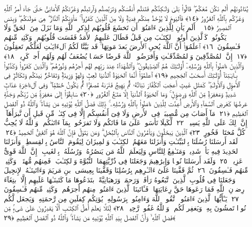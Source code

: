 يُنَادُونَهُم أَلَم نَكُن مَّعَكُم ۖ قَالُوا۟ بَلَىٰ وَلَـٰكِنَّكُم فَتَنتُم أَنفُسَكُم وَتَرَبَّصتُم وَٱرتَبتُم وَغَرَّتكُمُ ٱلأَمَانِىُّ حَتَّىٰ جَآءَ أَمرُ ٱللَّهِ وَغَرَّكُم بِٱللَّهِ ٱلغَرُورُ ﴿١٤﴾
 فَٱليَومَ لَا يُؤخَذُ مِنكُم فِديَةٌۭ وَلَا مِنَ ٱلَّذِينَ كَفَرُوا۟ ۚ مَأوَىٰكُمُ ٱلنَّارُ ۖ هِىَ مَولَىٰكُم ۖ وَبِئسَ ٱلمَصِيرُ ﴿١٥﴾
 ۞ أَلَم يَأنِ لِلَّذِينَ ءَامَنُوٓا۟ أَن تَخشَعَ قُلُوبُهُم لِذِكرِ ٱللَّهِ وَمَا نَزَلَ مِنَ ٱلحَقِّ وَلَا يَكُونُوا۟ كَٱلَّذِينَ أُوتُوا۟ ٱلكِتَـٰبَ مِن قَبلُ فَطَالَ عَلَيهِمُ ٱلأَمَدُ فَقَسَت قُلُوبُهُم ۖ وَكَثِيرٌۭ مِّنهُم فَـٰسِقُونَ ﴿١٦﴾
 ٱعلَمُوٓا۟ أَنَّ ٱللَّهَ يُحىِ ٱلأَرضَ بَعدَ مَوتِهَا ۚ قَد بَيَّنَّا لَكُمُ ٱلءَايَـٰتِ لَعَلَّكُم تَعقِلُونَ ﴿١٧﴾
 إِنَّ ٱلمُصَّدِّقِينَ وَٱلمُصَّدِّقَـٰتِ وَأَقرَضُوا۟ ٱللَّهَ قَرضًا حَسَنًۭا يُضَٰعَفُ لَهُم وَلَهُم أَجرٌۭ كَرِيمٌۭ ﴿١٨﴾
 وَٱلَّذِينَ ءَامَنُوا۟ بِٱللَّهِ وَرُسُلِهِۦٓ أُو۟لَـٰٓئِكَ هُمُ ٱلصِّدِّيقُونَ ۖ وَٱلشُّهَدَآءُ عِندَ رَبِّهِم لَهُم أَجرُهُم وَنُورُهُم ۖ وَٱلَّذِينَ كَفَرُوا۟ وَكَذَّبُوا۟ بِـَٔايَـٰتِنَآ أُو۟لَـٰٓئِكَ أَصحَـٰبُ ٱلجَحِيمِ ﴿١٩﴾
 ٱعلَمُوٓا۟ أَنَّمَا ٱلحَيَوٰةُ ٱلدُّنيَا لَعِبٌۭ وَلَهوٌۭ وَزِينَةٌۭ وَتَفَاخُرٌۢ بَينَكُم وَتَكَاثُرٌۭ فِى ٱلأَموَٟلِ وَٱلأَولَـٰدِ ۖ كَمَثَلِ غَيثٍ أَعجَبَ ٱلكُفَّارَ نَبَاتُهُۥ ثُمَّ يَهِيجُ فَتَرَىٰهُ مُصفَرًّۭا ثُمَّ يَكُونُ حُطَٰمًۭا ۖ وَفِى ٱلءَاخِرَةِ عَذَابٌۭ شَدِيدٌۭ وَمَغفِرَةٌۭ مِّنَ ٱللَّهِ وَرِضوَٟنٌۭ ۚ وَمَا ٱلحَيَوٰةُ ٱلدُّنيَآ إِلَّا مَتَـٰعُ ٱلغُرُورِ ﴿٢٠﴾
 سَابِقُوٓا۟ إِلَىٰ مَغفِرَةٍۢ مِّن رَّبِّكُم وَجَنَّةٍ عَرضُهَا كَعَرضِ ٱلسَّمَآءِ وَٱلأَرضِ أُعِدَّت لِلَّذِينَ ءَامَنُوا۟ بِٱللَّهِ وَرُسُلِهِۦ ۚ ذَٟلِكَ فَضلُ ٱللَّهِ يُؤتِيهِ مَن يَشَآءُ ۚ وَٱللَّهُ ذُو ٱلفَضلِ ٱلعَظِيمِ ﴿٢١﴾
 مَآ أَصَابَ مِن مُّصِيبَةٍۢ فِى ٱلأَرضِ وَلَا فِىٓ أَنفُسِكُم إِلَّا فِى كِتَـٰبٍۢ مِّن قَبلِ أَن نَّبرَأَهَآ ۚ إِنَّ ذَٟلِكَ عَلَى ٱللَّهِ يَسِيرٌۭ ﴿٢٢﴾
 لِّكَيلَا تَأسَوا۟ عَلَىٰ مَا فَاتَكُم وَلَا تَفرَحُوا۟ بِمَآ ءَاتَىٰكُم ۗ وَٱللَّهُ لَا يُحِبُّ كُلَّ مُختَالٍۢ فَخُورٍ ﴿٢٣﴾
 ٱلَّذِينَ يَبخَلُونَ وَيَأمُرُونَ ٱلنَّاسَ بِٱلبُخلِ ۗ وَمَن يَتَوَلَّ فَإِنَّ ٱللَّهَ هُوَ ٱلغَنِىُّ ٱلحَمِيدُ ﴿٢٤﴾
 لَقَد أَرسَلنَا رُسُلَنَا بِٱلبَيِّنَـٰتِ وَأَنزَلنَا مَعَهُمُ ٱلكِتَـٰبَ وَٱلمِيزَانَ لِيَقُومَ ٱلنَّاسُ بِٱلقِسطِ ۖ وَأَنزَلنَا ٱلحَدِيدَ فِيهِ بَأسٌۭ شَدِيدٌۭ وَمَنَـٰفِعُ لِلنَّاسِ وَلِيَعلَمَ ٱللَّهُ مَن يَنصُرُهُۥ وَرُسُلَهُۥ بِٱلغَيبِ ۚ إِنَّ ٱللَّهَ قَوِىٌّ عَزِيزٌۭ ﴿٢٥﴾
 وَلَقَد أَرسَلنَا نُوحًۭا وَإِبرَٰهِيمَ وَجَعَلنَا فِى ذُرِّيَّتِهِمَا ٱلنُّبُوَّةَ وَٱلكِتَـٰبَ ۖ فَمِنهُم مُّهتَدٍۢ ۖ وَكَثِيرٌۭ مِّنهُم فَـٰسِقُونَ ﴿٢٦﴾
 ثُمَّ قَفَّينَا عَلَىٰٓ ءَاثَـٰرِهِم بِرُسُلِنَا وَقَفَّينَا بِعِيسَى ٱبنِ مَريَمَ وَءَاتَينَـٰهُ ٱلإِنجِيلَ وَجَعَلنَا فِى قُلُوبِ ٱلَّذِينَ ٱتَّبَعُوهُ رَأفَةًۭ وَرَحمَةًۭ وَرَهبَانِيَّةً ٱبتَدَعُوهَا مَا كَتَبنَـٰهَا عَلَيهِم إِلَّا ٱبتِغَآءَ رِضوَٟنِ ٱللَّهِ فَمَا رَعَوهَا حَقَّ رِعَايَتِهَا ۖ فَـَٔاتَينَا ٱلَّذِينَ ءَامَنُوا۟ مِنهُم أَجرَهُم ۖ وَكَثِيرٌۭ مِّنهُم فَـٰسِقُونَ ﴿٢٧﴾
 يَـٰٓأَيُّهَا ٱلَّذِينَ ءَامَنُوا۟ ٱتَّقُوا۟ ٱللَّهَ وَءَامِنُوا۟ بِرَسُولِهِۦ يُؤتِكُم كِفلَينِ مِن رَّحمَتِهِۦ وَيَجعَل لَّكُم نُورًۭا تَمشُونَ بِهِۦ وَيَغفِر لَكُم ۚ وَٱللَّهُ غَفُورٌۭ رَّحِيمٌۭ ﴿٢٨﴾
 لِّئَلَّا يَعلَمَ أَهلُ ٱلكِتَـٰبِ أَلَّا يَقدِرُونَ عَلَىٰ شَىءٍۢ مِّن فَضلِ ٱللَّهِ ۙ وَأَنَّ ٱلفَضلَ بِيَدِ ٱللَّهِ يُؤتِيهِ مَن يَشَآءُ ۚ وَٱللَّهُ ذُو ٱلفَضلِ ٱلعَظِيمِ ﴿٢٩﴾
 
